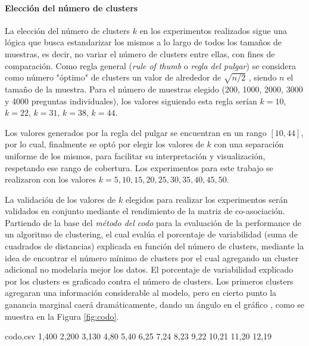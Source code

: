 \paragraph{Elección del número de clusters}
La elección del número de clusters \(k\) en los experimentos realizados sigue una lógica que busca estandarizar los mismos a lo largo de todos los tamaños de muestras, es decir, no variar el número de clusters entre ellas, con fines de comparación. Como regla general (\textit{rule of thumb} o \textit{regla del pulgar}) se considera como número "óptimo" de clusters un valor de alrededor de \(\sqrt{n/2}\) \citep{kodinariya2013review}, siendo \(n\) el tamaño de la muestra. Para el número de muestras elegido (200, 1000, 2000, 3000 y 4000 preguntas individuales), los valores siguiendo esta regla serían \(k = 10\), \(k = 22\), \(k = 31\), \(k = 38\), \(k =44\).

\bigskip Los valores generados por la regla del pulgar se encuentran en un rango \([10, 44]\), por lo cual, finalmente se optó por elegir los valores de \(k\) con una separación uniforme de los mismos, para facilitar su interpretación y visualización, respetando ese rango de cobertura. Los experimentos para este trabajo se realizaron con los valores \(k = 5, 10, 15, 20, 25, 30, 35, 40, 45, 50\).

\bigskip La validación de los valores de \(k\) elegidos para realizar los experimentos serán validados en conjunto mediante el rendimiento de la matriz de co-asociación. Partiendo de la base del \textit{método del codo} para la evaluación de la performance de un algoritmo de clustering, el cual evalúa el porcentaje de variabilidad (suma de cuadrados de distancias) explicada en función del número de clusters, mediante la idea de encontrar el número mínimo de clusters por el cual agregando un cluster adicional no modelaría mejor los datos. El porcentaje de variabilidad explicado por los clusters es graficado contra el número de clusters. Los primeros clusters agregaran una información considerable al modelo, pero en cierto punto la ganancia marginal caerá dramáticamente, dando un ángulo en el gráfico \citep{bholowalia2014ebk}, como se muestra en la Figura \ref{fig:codo}.

\begin{filecontents*}{codo.csv}
1,400
2,200
3,130
4,80
5,40
6,25
7,24
8,23
9,22
10,21
11,20
12,19
\end{filecontents*}

